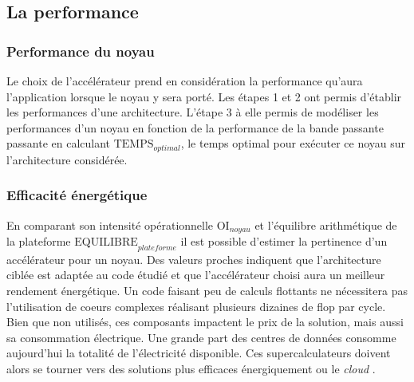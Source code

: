 \subsection{La performance}
    
    \subsubsection{Performance du noyau}
        Le choix de l'accélérateur prend en considération la performance qu'aura l'application lorsque le noyau y sera porté. Les étapes 1 et 2 ont permis d'établir les performances d'une architecture. L'étape 3 à elle permis de modéliser les performances d'un noyau en fonction de la performance de la bande passante passante en calculant $\text{TEMPS}_{optimal}$, le temps optimal pour exécuter ce noyau sur l'architecture considérée.
    
    \subsubsection{Efficacité énergétique}
        En comparant son intensité opérationnelle  $\text{OI}_{noyau}$ et l'équilibre arithmétique de la plateforme $\text{EQUILIBRE}_{plateforme}$ il est possible d'estimer la pertinence d'un accélérateur pour un noyau. Des valeurs proches indiquent que l'architecture ciblée est adaptée au code étudié et que l'accélérateur choisi aura un meilleur rendement énergétique. Un code faisant peu de calculs flottants ne nécessitera pas l'utilisation de coeurs complexes réalisant plusieurs dizaines de flop par cycle. Bien que non utilisés, ces composants impactent le prix de la solution, mais aussi sa consommation électrique. Une grande part des centres de données consomme aujourd'hui la totalité de l'électricité disponible. Ces supercalculateurs doivent alors se tourner vers des solutions plus efficaces énergiquement ou le \textit{cloud} \cite{Rodero2012}.
        
    
